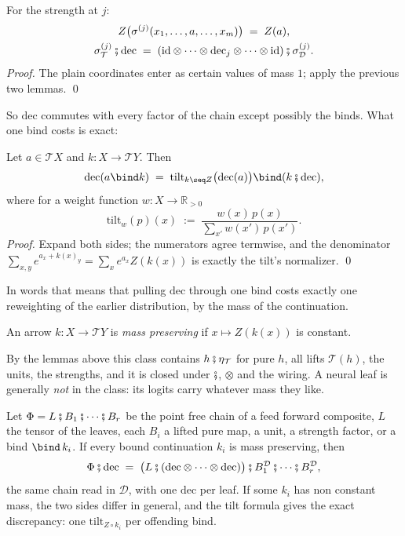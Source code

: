 \documentclass[anon]{../../journal-templates/NeSy26/nesy2026} %
\begin{document}
\begin{description}
\begin{lemma}[strengths]
For the strength at $j$:
\begin{gather*}
  Z\bigl(\sigma^{(j)}(x_1,\dots,a,\dots,x_m)\bigr) \;=\; Z(a),\\
  \sigma^{(j)}_{\mathcal T} \fatsemi \mathrm{dec}
  \;=\;
  (\mathrm{id} \otimes \cdots \otimes \mathrm{dec}_j \otimes \cdots \otimes \mathrm{id})
  \fatsemi \sigma^{(j)}_{\mathcal D}.
\end{gather*}
\emph{Proof.} The plain coordinates enter as certain values of mass $1$;
apply the previous two lemmas. \qed
\end{lemma}

\noindent
So $\mathrm{dec}$ commutes with every factor of the chain except possibly
the binds. What one bind costs is exact:

\begin{lemma}[tilt]
Let $a \in \mathcal T X$ and $k \colon X \to \mathcal T Y$. Then
\[
  \mathrm{dec}(a \bind k)
  \;=\;
  \mathrm{tilt}_{k \seq Z}\bigl(\mathrm{dec}(a)\bigr) \bind (k \fatsemi \mathrm{dec}),
\]
where for a weight function $w \colon X \to \mathbb R_{>0}$
\[
  \mathrm{tilt}_w(p)(x) \;:=\; \frac{w(x)\,p(x)}{\sum_{x'} w(x')\,p(x')}.
\]
\emph{Proof.} Expand both sides; the numerators agree termwise, and the
denominator $\sum_{x,y} e^{a_x + k(x)_y} = \sum_x e^{a_x} Z(k(x))$ is
exactly the tilt's normalizer. \qed\\
\end{lemma}

In words that means that pulling $\mathrm{dec}$ through one bind costs exactly one
reweighting of the earlier distribution, by the mass of the continuation.

\begin{definition}
An arrow $k \colon X \to \mathcal T Y$ is \emph{mass preserving} if
$x \mapsto Z(k(x))$ is constant. 
\end{definition}

By the lemmas above this class contains
$h \fatsemi \eta_{\mathcal T}$ for pure $h$, all lifts $\mathcal T(h)$, the
units, the strengths, and it is closed under $\fatsemi$, $\otimes$ and the
wiring. A neural leaf is generally \emph{not} in the class: its logits
carry whatever mass they like.

\begin{theorem}
Let $\Phi = L \fatsemi B_1 \fatsemi \cdots \fatsemi B_r$ be the point free
chain of a feed forward composite, $L$ the tensor of the leaves, each $B_i$
a lifted pure map, a unit, a strength factor, or a bind ${\bind}\,k_i$. If
every bound continuation $k_i$ is mass preserving, then
\[
  \Phi \fatsemi \mathrm{dec}
  \;=\;
  \bigl(L \fatsemi (\mathrm{dec} \otimes \cdots \otimes \mathrm{dec})\bigr)
  \fatsemi B_1^{\mathcal D} \fatsemi \cdots \fatsemi B_r^{\mathcal D},
\]
the same chain read in $\mathcal D$, with one $\mathrm{dec}$ per leaf. If
some $k_i$ has non constant mass, the two sides differ in general, and the
tilt formula gives the exact discrepancy: one $\mathrm{tilt}_{Z \circ k_i}$
per offending bind.


\end{theorem}
\end{description}
\end{document}
